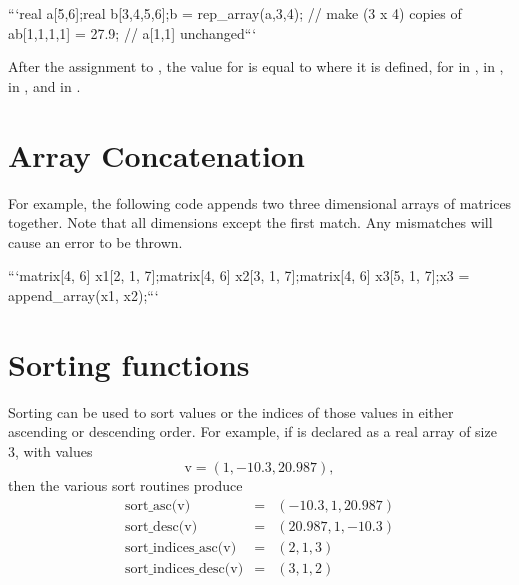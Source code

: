 \begin{description}
{```\n real a[5,6];\n real b[3,4,5,6];\n \n b = rep_array(a,3,4); //  make (3 x 4) copies of a\n b[1,1,1,1] = 27.9;    //  a[1,1] unchanged\n ```


After the assignment to , the value for  is equal to  where it is defined, for  in ,  in ,  in , and  in .


\section{Array Concatenation}\label{array-concatenation.section}


\begin{description}  \end{description}


For example, the following code appends two three dimensional arrays of matrices together. Note that all dimensions except the first match. Any mismatches will cause an error to be thrown.


```\n matrix[4, 6] x1[2, 1, 7];\n matrix[4, 6] x2[3, 1, 7];\n matrix[4, 6] x3[5, 1, 7];\n \n x3 = append_array(x1, x2);\n ```


\section{Sorting functions}\label{sorting-functions.section}


Sorting can be used to sort values or the indices of those values in either ascending or descending order.  For example, if  is declared as a real array of size 3, with values \[ \text{v} = (1, -10.3, 20.987), \] then the various sort routines produce  \begin{eqnarray*} \text{sort_asc(v)} & = &  (-10.3,1,20.987) \\[4pt] \text{sort_desc(v)} & = &  (20.987,1,-10.3) \\[4pt] \text{sort_indices_asc(v)} & = &  (2,1,3) \\[4pt] \text{sort_indices_desc(v)} & = &  (3,1,2) \end{eqnarray*}


}
\end{description}

